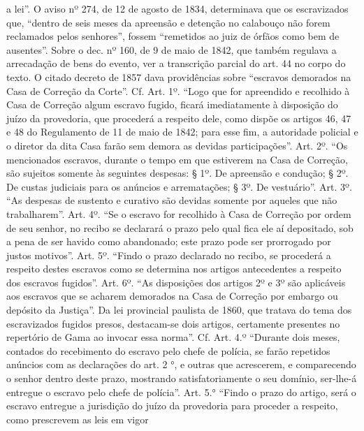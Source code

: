 {  a lei''. O aviso nº 274, de 12 de agosto de 1834, determinava que os escravizados
  que, ``dentro de seis meses da apreensão e detenção no calabouço não
  forem reclamados pelos senhores'', fossem ``remetidos ao juiz de órfãos
  como bem de ausentes''.
  Sobre o dec. nº 160, de 9 de maio de 1842, que também
  regulava a arrecadação de bens do evento, ver a transcrição parcial do
  art. 44 no corpo do texto. O citado decreto de 1857 dava providências
  sobre ``escravos demorados na Casa de Correção da Corte''. Cf. Art.
  1º. ``Logo que for apreendido e recolhido à Casa de Correção algum
  escravo fugido, ficará imediatamente à disposição do juízo da
  provedoria, que procederá a respeito dele, como dispõe os artigos 46,
  47 e 48 do Regulamento de 11 de maio de 1842; para esse fim, a autoridade
  policial e o diretor da dita Casa farão sem demora as devidas
  participações''. Art. 2º. ``Os mencionados escravos, durante o tempo em
  que estiverem na Casa de Correção, são sujeitos somente às seguintes
  despesas: § 1º. De apreensão e condução; § 2º. De custas judiciais
  para os anúncios e arrematações; § 3º. De vestuário''. Art. 3º. ``As
  despesas de sustento e curativo são devidas somente por aqueles que
  não trabalharem''. Art. 4º. ``Se o escravo for recolhido à Casa de
  Correção por ordem de seu senhor, no recibo se declarará o prazo pelo
  qual fica ele aí depositado, sob a pena de ser havido como abandonado;
  este prazo pode ser prorrogado por justos motivos''. Art. 5º. ``Findo o
  prazo declarado no recibo, se procederá a respeito destes escravos
  como se determina nos artigos antecedentes a respeito dos escravos
  fugidos''. Art. 6º. ``As disposições dos artigos 2º e 3º são aplicáveis
  aos escravos que se acharem demorados na Casa de Correção por embargo
  ou depósito da Justiça''. Da lei provincial paulista de 1860, que
  tratava do tema dos escravizados fugidos presos, destacam-se dois
  artigos, certamente presentes no repertório de Gama ao invocar essa
  norma''. Cf. Art. 4.º ``Durante dois meses, contados do recebimento do
  escravo pelo chefe de polícia, se farão repetidos anúncios com as
  declarações do art. 2 °, e outras que acrescerem, e comparecendo o
  senhor dentro deste prazo, mostrando satisfatoriamente o seu domínio,
  ser-lhe-á entregue o escravo pelo chefe de polícia''. Art. 5.° ``Findo o
  prazo do artigo, será o escravo entregue a jurisdição do juízo da
  provedoria para proceder a respeito, como prescrevem as leis em vigor
}
